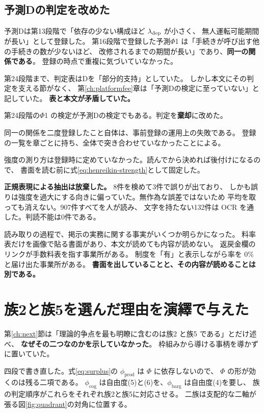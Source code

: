 \subsection{予測Dの判定を改めた}

予測Dは第13段階で「依存の少ない構成ほど $\lambda_{\rm dep}$ が小さく、
無人運転可能期間が長い」として登録した。
第16段階で登録した予測$\Phi$1 は「手続きが呼び出す他の手続きの数が少ないほど、
改修されるまでの期間が長い」であり、\textbf{同一の関係である}。
登録の時点で重複に気づいていなかった。

第24段階まで、判定表はDを「部分的支持」としていた。
しかし本文にその判定を支える節がなく、
第\ref{ch:platformfee}章は「予測Dの検定に至っていない」と記していた。
\textbf{表と本文が矛盾していた。}

第24段階の$\Phi$1 の検定が予測Dの検定でもある。判定を\textbf{棄却}に改めた。

同一の関係を二度登録したこと自体は、事前登録の運用上の失敗である。
登録の一覧を章ごとに持ち、全体で突き合わせていなかったことによる。

強度の測り方は登録時に定めていなかった。読んでから決めれば後付けになるので、
書面を読む前に式\eqref{eq:henreikin-strength}として固定した。

\textbf{正規表現による抽出は放棄した。} 8件を検めて3件で誤りが出ており、
しかも誤りは強度を過大にする向きに偏っていた。無作為な誤差ではないため
平均を取っても消えない。907件すべてを人が読み、
文字を持たない132件は OCR を通した。判読不能は0件である。

読み取りの過程で、掲示の実務に関する事実がいくつか明らかになった。
料率表だけを画像で貼る書面があり、本文が読めても内容が読めない。
返戻金欄のリンクが手数料表を指す事業所がある。
制度を「有」と表示しながら率を 0\% と届け出た事業所がある。
\textbf{書面を出していることと、その内容が読めることは別である。}

\section{族2と族5を選んだ理由を演繹で与えた}

第\ref{ch:next}節は「理論的争点を最も明瞭に含むのは族2 と族5 である」とだけ述べ、
\textbf{なぜその二つなのかを示していなかった}。
枠組みから導ける事柄を導かずに置いていた。

四段で書き直した。式\eqref{eq:surplus}の $\phi_{\mathrm{prod}}$ は $\Phi$ に依存しないので、
$\Phi$ の形が効くのは残る二項である。
$\phi_{\mathrm{cog}}$ は自由度(5)と(6)を、$\phi_{\mathrm{barg}}$ は自由度(4)を要し、
族の判定順序がこれらをそれぞれ族2と族5に対応させる。
二族は支配的な二軸が張る図\ref{fig:quadrant}の対角に位置する。

